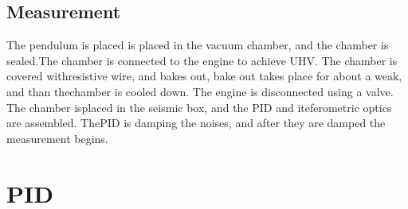 \documentclass[\main/master.tex]{subfiles}
\begin{document}
\subsection{Measurement}
The pendulum is placed is placed in the vacuum chamber, and the chamber is sealed.The chamber is connected to the engine to achieve UHV. The chamber is covered withresistive wire, and bakes out, bake out takes place for about a weak, and than thechamber is cooled down. The engine is disconnected using a valve. The chamber isplaced in the seismic box, and the PID and iteferometric optics are assembled. ThePID is damping the noises, and after they are damped the measurement begins.

\section{PID}
\end{document}
